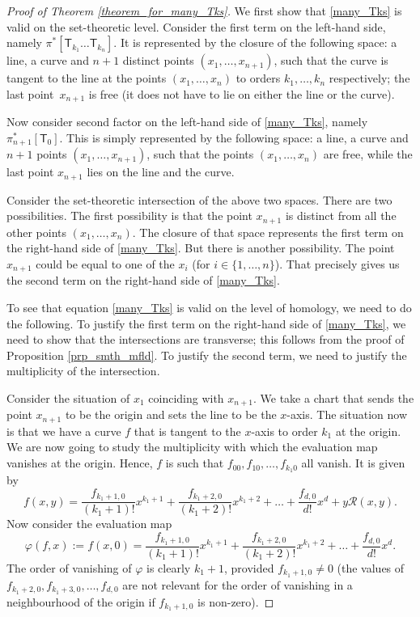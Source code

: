 \documentclass[11pt]{article}
\numberwithin{equation}{section}
\begin{document}
\begin{proof}[Proof of Theorem \ref{theorem_for_many_Tks}]
We first show that \eqref{many_Tks} is valid on the set-theoretic level. Consider the first term
on the left-hand side, namely
$\pi^{\ast}[\mathsf{T}_{k_1}\dots \mathsf{T}_{k_n}]$.
It is represented by the closure of the following space: a line, a curve and
$n+1$ distinct points $(x_1,\dots, x_{n+1})$, such that the
curve is tangent to the line at the points
$(x_1,\dots, x_n)$ to orders $k_1,\dots, k_n$
respectively; the last point~$x_{n+1}$ is free (it does not have to lie on either the line or the curve).

Now consider second factor on the left-hand side of \eqref{many_Tks},
namely $\pi_{n+1}^{\ast}[\mathsf{T}_0]$.
This is simply represented by the following space: a
line, a curve and $n+1$ points $(x_1,\dots, x_{n+1})$,
such that the points $(x_1,\dots, x_n)$ are free, while the last point $x_{n+1}$ lies on the line
and the curve.

Consider the set-theoretic intersection of the above two spaces. There are two possibilities. The first
possibility is that the point $x_{n+1}$ is distinct from all the other points
$(x_1,\dots, x_n)$.
The closure of that space represents the first term on the right-hand side of
\eqref{many_Tks}. But there is another possibility. The point $x_{n+1}$ could be equal to one of the
$x_i$
(for $i \in \{1,\dots, n\}$).
That precisely gives us the second term on the right-hand side of \eqref{many_Tks}.

To see that equation \eqref{many_Tks} is valid on the level of homology,
we need to do the following.
To justify the first term on the right-hand side of \eqref{many_Tks},
we need to
show that the intersections are transverse;
this follows from the proof of Proposition \ref{prp_smth_mfld}.
To justify the second term,
we need to justify the multiplicity of the intersection.

Consider the situation of
$x_1$ coinciding with $x_{n+1}$. We take a chart that sends the point
$x_{n+1}$ to be the origin and sets the line to be the $x$-axis.
The situation now is that we have a curve $f$ that is tangent to the $x$-axis to order $k_1$
at the origin. We are now going to
study the multiplicity with which the evaluation map vanishes at the origin.
Hence, $f$ is such that $f_{00}, f_{10}, \dots , f_{k_1 0}$ all vanish. It is given by
\[
f(x, y)  =  \frac{f_{k_1+1, 0}}{(k_1+1)!} x^{k_1+1}
+\frac{f_{k_1+2, 0}}{(k_1+2)!} x^{k_1+2} + \dots +
\frac{f_{d, 0}}{d !} x^{d}  + y \mathcal{R}(x, y).
\]
Now consider the evaluation map
\[
\varphi(f, x) :=  f(x, 0)  = \frac{f_{k_1+1, 0}}{(k_1+1)!} x^{k_1+1}
+\frac{f_{k_1+2, 0}}{(k_1+2)!} x^{k_1+2} + \dots +
\frac{f_{d, 0}}{d !} x^{d}.
\]
The order of vanishing of $\varphi$ is clearly $k_1+1$, provided
$f_{k_1+1, 0} \neq 0$
(the values of $f_{k_1+2, 0}, f_{k_1+3, 0},\allowbreak \dots, f_{d,0}$ are not relevant for the order of vanishing
in a neighbourhood of the origin if $f_{k_1+1, 0}$ is non-zero).


\end{proof}
\end{document}
